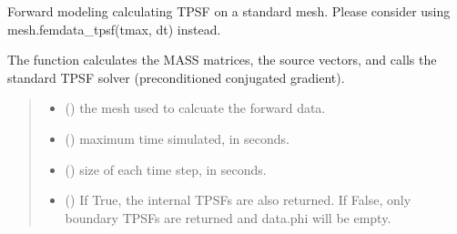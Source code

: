 \documentclass[letterpaper,10pt,english]{sphinxmanual}
\begin{document}
\begin{fulllineitems}
\label{\detokenize{_autosummary/nirfasterff.forward.femdata.femdata_stnd_TR:nirfasterff.forward.femdata.femdata_stnd_TR}}
\pysigstartsignatures
{}
\pysigstopsignatures
\sphinxAtStartPar
Forward modeling calculating TPSF on a standard mesh. Please consider using mesh.femdata\_tpsf(tmax, dt) instead.

\sphinxAtStartPar
The function calculates the MASS matrices, the source vectors, and calls the standard TPSF solver (preconditioned conjugated gradient).
\begin{quote}\begin{description}
\begin{itemize}
\item {} 
\sphinxAtStartPar
{} () \textendash{} the mesh used to calcuate the forward data.

\item {} 
\sphinxAtStartPar
{} () \textendash{} maximum time simulated, in seconds.

\item {} 
\sphinxAtStartPar
{} () \textendash{} size of each time step, in seconds.

\item {} 
\sphinxAtStartPar
{} (\sphinxstyleliteralemphasis{\sphinxupquote{, }}) \textendash{} 
\sphinxAtStartPar
If True, the internal TPSFs are also returned. If False, only boundary TPSFs are returned and data.phi will be empty.


\end{itemize}
\end{description}
\end{quote}
\end{fulllineitems}
\end{document}
